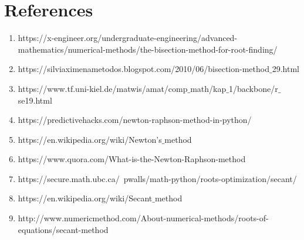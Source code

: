 \documentclass[11pt]{article}
\begin{document}
\section{References}
\begin{enumerate}
	\item  https://x-engineer.org/undergraduate-engineering/advanced-mathematics/numerical-methods/the-bisection-method-for-root-finding/ 	
	\item https://silviaximenametodos.blogspot.com/2010/06/bisection-method$\_$29.html
	\item https://www.tf.uni-kiel.de/matwis/amat/comp$\_$math/kap$\_$1/backbone/r$\_$se19.html
	\item https://predictivehacks.com/newton-raphson-method-in-python/
	\item https://en.wikipedia.org/wiki/Newton's$\_$method
	\item https://www.quora.com/What-is-the-Newton-Raphson-method
	\item https://secure.math.ubc.ca/~pwalls/math-python/roots-optimization/secant/
	\item https://en.wikipedia.org/wiki/Secant$\_$method
	\item http://www.numericmethod.com/About-numerical-methods/roots-of-equations/secant-method
\end{enumerate}
\end{document}
